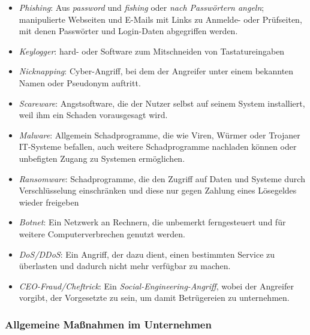 \documentclass[a4paper, 12pt]{report}
\begin{document}
\begin{itemize}
    \item \emph{Phishing}: Aus \emph{password} und \emph{fishing} oder 
    \emph{nach Passwörtern angeln}; manipulierte Webseiten und E-Mails mit Links
    zu Anmelde- oder Prüfseiten, mit denen Passwörter und Login-Daten 
    abgegriffen werden. 
    \item \emph{Keylogger}: hard- oder Software zum Mitschneiden von 
    Tastatureingaben
    \item \emph{Nicknapping}: Cyber-Angriff, bei dem der Angreifer unter einem 
    bekannten Namen oder Pseudonym auftritt. 
    \item \emph{Scareware}: Angstsoftware, die der Nutzer selbst auf seinem 
    System installiert, weil ihm ein Schaden vorausgesagt wird. 
    \item \emph{Malware}: Allgemein Schadprogramme, die wie Viren, Würmer oder 
    Trojaner IT-Systeme befallen, auch weitere Schadprogramme nachladen können 
    oder unbefigten Zugang zu Systemen ermöglichen. 
    \item \emph{Ransomware}: Schadprogramme, die den Zugriff auf Daten und 
    Systeme durch Verschlüsselung einschränken und diese nur gegen Zahlung eines 
    Lösegeldes wieder freigeben
    \item \emph{Botnet}: Ein Netzwerk an Rechnern, die unbemerkt ferngesteuert 
    und für weitere Computerverbrechen genutzt werden. 
    \item \emph{DoS/DDoS}: Ein Angriff, der dazu dient, einen bestimmten Service 
    zu überlasten und dadurch nicht mehr verfügbar zu machen. 
    \item  \emph{CEO-Fraud/Cheftrick}: Ein \emph{Social-Engineering-Angriff}, 
    wobei der Angreifer vorgibt, der Vorgesetzte zu sein, um damit Betrügereien 
    zu unternehmen.  
\end{itemize}

\subsubsection{Allgemeine Maßnahmen im Unternehmen}
\end{document}
